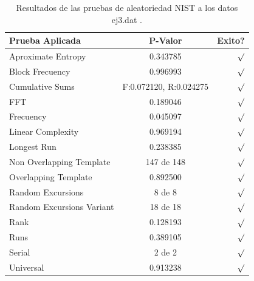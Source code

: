\documentclass[10pt]{IEEEtran}
\begin{document}
\begin{table}[H]
\caption{Resultados de las pruebas de aleatoriedad NIST a los datos ej3.dat .}
\label{caso1}
\begin{center}
\begin{small}
\begin{tabular}{|l|c|r|}
\hline

Prueba Aplicada &  P-Valor & Exito? \\
\hline

Aproximate Entropy    &     0.343785  & $\surd$ \\

Block Frecuency  & 0.996993  &  $\surd$  \\

Cumulative Sums    &   F:0.072120, R:0.024275 & $\surd$ \\

FFT    &   0.189046 &  $\surd$     \\

Frecuency     &  0.045097  &  $\surd$   \\

Linear Complexity      & 0.969194 & $\surd$ \\

Longest Run      &   0.238385 &    $\surd$      \\

Non Overlapping Template      & 147 de 148    &     $\surd$          \\

Overlapping Template      &  0.892500   &      $\surd$      \\

Random Excursions      & 8 de 8  &    $\surd$      \\

Random Excursions Variant & 18 de 18 &     $\surd$    \\

Rank & 0.128193  &      $\surd$      \\

Runs &    0.389105 &     $\surd$        \\

Serial &     2 de 2    &     $\surd$        \\

Universal &     0.913238  &   $\surd$            \\

\hline

\end{tabular}
\end{small}
\end{center}
\end{table}
\end{document}
